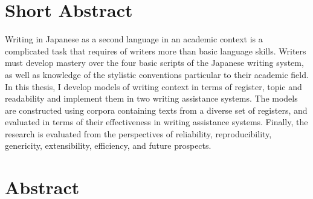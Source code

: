 

\begingroup
\let\clearpage\relax
\let\cleardoublepage\relax
\let\cleardoublepage\relax

\chapter*{Short Abstract} %

Writing in Japanese as a second language in an academic context is a complicated task that requires of writers more than basic language skills. Writers must develop mastery over the four basic scripts of the Japanese writing system, as well as knowledge of the stylistic conventions particular to their academic field. In this thesis, I develop models of writing context in terms of register, topic and readability and implement them in two writing assistance systems. The models are constructed using corpora containing texts from a diverse set of registers, and evaluated in terms of their effectiveness in writing assistance systems. Finally, the research is evaluated from the perspectives of reliability, reproducibility, genericity, extensibility, efficiency, and future prospects.


\chapter*{Abstract} %



